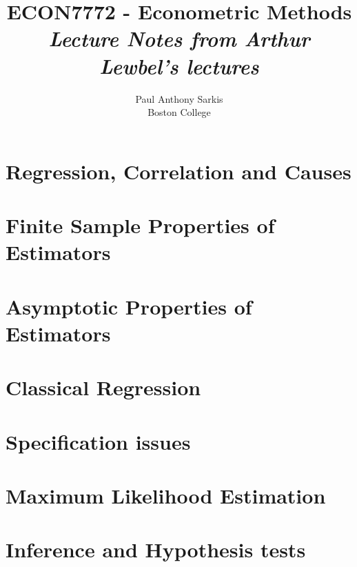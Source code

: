 \documentclass[12pt]{report} %
\begin{document}
\date{}
\title{\textbf{\huge{ECON7772 - Econometric Methods}}\\ \textit{Lecture Notes from Arthur Lewbel's lectures}}
\author{Paul Anthony Sarkis\\ Boston College} 
 
\maketitle

\tableofcontents

\chapter{Regression, Correlation and Causes}

\chapter{Finite Sample Properties of Estimators}



\chapter{Asymptotic Properties of Estimators} 



\chapter{Classical Regression}



\chapter{Specification issues}



\chapter{Maximum Likelihood Estimation}



\chapter{Inference and Hypothesis tests}
\end{document}
